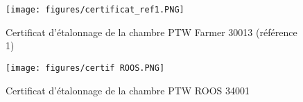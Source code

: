 \documentclass{article}
\begin{document}
\begin{figure}[h]
  \centering
  \texttt{[image: figures/certificat\_ref1.PNG]}
  \caption[short]{Certificat d'étalonnage de la chambre PTW Farmer 30013 (référence 1)}
  \label{fig_certif_ref1}
\end{figure}

\begin{figure}[h]
  \centering
  \texttt{[image: figures/certif ROOS.PNG]}
  \caption{Certificat d'étalonnage de la chambre PTW ROOS 34001}
  \label{fig_certif_ROOS}
\end{figure}

\clearpage


\nocite{*}
\end{document}
